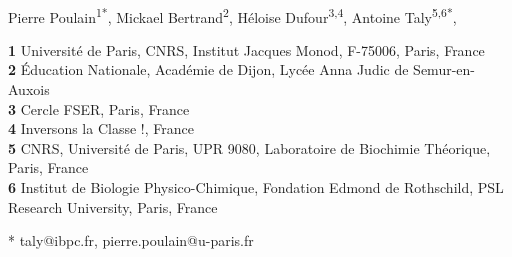 \documentclass[10pt,letterpaper]{article}
\begin{document}
\vspace*{0.2in}

\begin{flushleft}
{\Large
\textbf{} %
}
\newline
\\
Pierre Poulain\textsuperscript{1*},
Mickael Bertrand\textsuperscript{2},
Héloise Dufour\textsuperscript{3,4},
Antoine Taly\textsuperscript{5,6*},

\bigskip
\textbf{1} Université de Paris, CNRS, Institut Jacques Monod, F-75006, Paris, France
\\
\textbf{2} Éducation Nationale, Académie de Dijon, Lycée Anna Judic de Semur-en-Auxois
\\
\textbf{3} Cercle FSER, Paris, France
\\
\textbf{4} Inversons la Classe !, France
\\
\textbf{5} CNRS, Université de Paris, UPR 9080, Laboratoire de Biochimie Théorique, Paris, France
\\
\textbf{6} Institut de Biologie Physico-Chimique, Fondation Edmond de Rothschild, PSL Research University, Paris, France
\\
\bigskip

% 
%





* taly@ibpc.fr, pierre.poulain@u-paris.fr

\end{flushleft}
\end{document}
